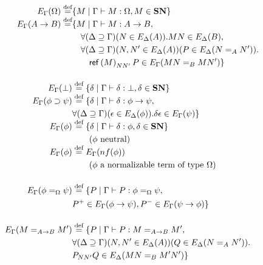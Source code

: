 \begin{definition}
\begin{align*}
E_\Gamma(\Omega) \mathrel{\smash{\stackrel{\text{def}}{=}}} & \{ M \mid \Gamma \vdash M : \Omega, M \in \mathbf{SN} \} \\
E_\Gamma(A \rightarrow B) \mathrel{\smash{\stackrel{\text{def}}{=}}} & \{ M \mid \Gamma \vdash M : A \rightarrow B, \\
& \quad \forall (\Delta \supseteq \Gamma) (N \in E_\Delta(A)). MN \in E_\Delta(B), \\
& \quad \forall (\Delta \supseteq \Gamma) (N, N' \in E_\Delta(A)) (P \in E_\Delta(N =_A N')). \\
& \quad \quad \mathsf{ref} \left( {M} \right)_{N N'} P \in E_\Gamma(MN =_B MN') \} \\
\\
E_\Gamma(\bot) & \mathrel{\smash{\stackrel{\text{def}}{=}}} \{ \delta \mid \Gamma \vdash \delta : \bot, \delta \in \mathbf{SN} \} \\
E_\Gamma(\phi \supset \psi) & \mathrel{\smash{\stackrel{\text{def}}{=}}} \{ \delta \mid \Gamma \vdash \delta : \phi \rightarrow \psi, \\
& \forall (\Delta \supseteq \Gamma)(\epsilon \in E_\Delta(\phi)). \delta \epsilon \in E_\Gamma(\psi) \} \\
E_\Gamma(\phi) & \mathrel{\smash{\stackrel{\text{def}}{=}}} \{ \delta \mid \Gamma \vdash \delta : \phi, \delta \in \mathbf{SN} \} \\
& \qquad (\phi \text{ neutral}) \\
E_\Gamma(\phi) & \mathrel{\smash{\stackrel{\text{def}}{=}}} E_\Gamma(nf(\phi)) \\
& \qquad (\phi \mbox{ a normalizable term of type $\Omega$}) \\
\\
E_\Gamma(\phi =_\Omega \psi) & \mathrel{\smash{\stackrel{\text{def}}{=}}} \{ P \mid \Gamma \vdash P : \phi =_\Omega \psi, \\
& P^+ \in E_\Gamma(\phi \rightarrow \psi), P^- \in E_\Gamma(\psi \rightarrow \phi) \} \\
\\
E_\Gamma(M =_{A \rightarrow B} M') & \mathrel{\smash{\stackrel{\text{def}}{=}}} \{ P \mid \Gamma \vdash P : M =_{A \rightarrow B} M', \\
& \forall (\Delta \supseteq \Gamma) (N, N' \in E_\Delta(A)) (Q \in E_\Delta(N =_A N')). \\
& P_{NN'}Q \in E_\Delta(MN =_B M'N') \}
\end{align*}
\end{definition}


